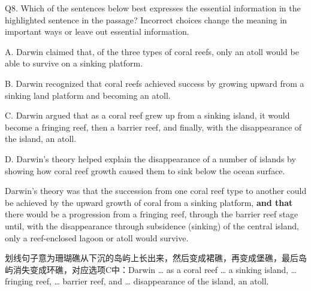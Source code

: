 \begin{blk}
    \begin{qst}
        Q8. Which of the sentences below best expresses the essential information in the highlighted sentence in the passage? Incorrect choices change the meaning in important ways or leave out essential information.
    \end{qst}

    \begin{chc}
        A. Darwin claimed that, of the three types of coral reefs, only an atoll would be able to survive on a sinking platform.

        B. Darwin recognized that coral reefs achieved success by growing upward from a sinking land platform and becoming an atoll.

        C. Darwin argued that as a coral reef grew up from a sinking island, it would become a fringing reef, then a barrier reef, and finally, with the disappearance of the island, an atoll.

        D. Darwin’s theory helped explain the disappearance of a number of islands by showing how coral reef growth caused them to sink below the ocean surface.
    \end{chc}

    \begin{psgq}
        Darwin’s theory was that the succession from one coral reef type to another could be achieved by the upward growth of coral from a sinking platform, \textbf{and that} there would be a progression from a fringing reef, through the barrier reef stage until, with the disappearance through subsidence (sinking) of the central island, only a reef-enclosed lagoon or atoll would survive.
    \end{psgq}

    \begin{nlz}
        划线句子意为珊瑚礁从下沉的岛屿上长出来，然后变成裙礁，再变成堡礁，最后岛屿消失变成环礁，对应选项C中：Darwin … as a coral reef … a sinking island, … fringing reef, … barrier reef, and … disappearance of the island, an atoll.
    \end{nlz}
\end{blk}

